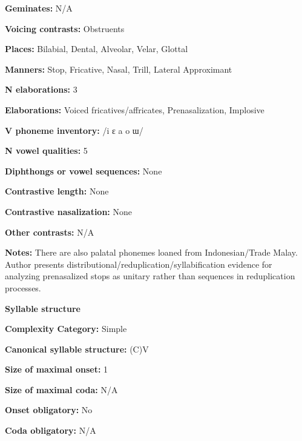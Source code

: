 \textbf{Geminates:} N/A



\textbf{Voicing contrasts:} Obstruents



\textbf{Places:} Bilabial, Dental, Alveolar, Velar, Glottal



\textbf{Manners:} Stop, Fricative, Nasal, Trill, Lateral Approximant



\textbf{N elaborations:} 3



\textbf{Elaborations:} Voiced fricatives/affricates, Prenasalization, Implosive



\textbf{V phoneme inventory:} /i ɛ a o ɯ/



\textbf{N vowel qualities:} 5



\textbf{Diphthongs or vowel sequences:} None



\textbf{Contrastive length:} None



\textbf{Contrastive nasalization:} None



\textbf{Other contrasts:} N/A



\textbf{Notes:} There are also palatal phonemes loaned from Indonesian/Trade Malay. Author presents distributional/reduplication/syllabification evidence for analyzing prenasalized stops as unitary rather than sequences in reduplication processes.



\textbf{Syllable structure}



\textbf{Complexity Category:} Simple



\textbf{Canonical syllable structure:} (C)V \citep[30-1]{Donohue1999}



\textbf{Size of maximal onset:} 1



\textbf{Size of maximal coda:} N/A



\textbf{Onset obligatory:} No



\textbf{Coda obligatory:} N/A



